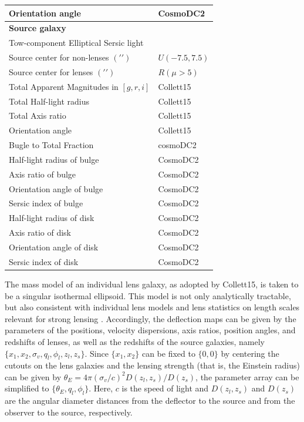 \documentclass[12pt, twocolumn, apj]{openjournal}
\begin{document}
\begin{table}
\begin{center}
\begin{tabular}{ l l}
Orientation angle & CosmoDC2 \\
\hline \hline
{\bf Source galaxy}\\
\hline \hline
{Tow-component Elliptical Sersic light} \\ 
\hline
Source center for non-lenses $(\prime\prime)$ & $U(-7.5, 7.5)$ \\
Source center for lenses $(\prime\prime)$ & $R(\mu > 5)$ \\
Total Apparent Magnitudes in $[g,r,i]$ & Collett15 \\
Total Half-light radius & Collett15 \\ 
Total Axis ratio & Collett15 \\
Orientation angle & Collett15 \\
Bugle to Total Fraction & cosmoDC2\\
\hline
Half-light radius of bulge & CosmoDC2 \\ 
Axis ratio of bulge & CosmoDC2 \\
Orientation angle of bulge & CosmoDC2 \\
Sersic index of bulge & CosmoDC2\\
\hline
Half-light radius of disk & CosmoDC2 \\ 
Axis ratio of disk & CosmoDC2 \\
Orientation angle of disk & CosmoDC2 \\
Sersic index of disk & CosmoDC2 \\
\hline
\hline
\end{tabular}
\end{center}
\end{table}



The mass model of an individual lens galaxy, as adopted by Collett15, is taken to be a singular isothermal ellipsoid.  This model is not only analytically tractable, but also consistent with individual lens models and lens statistics on length scales relevant for strong lensing \citep{Koopmans2006, Gavazzi2007, Dye2008}. Accordingly, the deflection maps can be given by the parameters of the positions, velocity dispersions, axis ratios, position angles, and redshifts of lenses, as well as the redshifts of the source galaxies, namely $\{x_1, x_2, \sigma_v, q_l, \phi_l, z_l, z_s\}$. Since $\{x_1, x_2\}$ can be fixed to $\{0, 0\}$ by centering the cutouts on the lens galaxies and the lensing strength (that is, the Einstein radius) can be given by $\theta_E = 4 \pi (\sigma_v/c)^2 D(z_l, z_s)/D(z_s)$, the parameter array can be simplified to $\{\theta_E, q_l, \phi_l\}$. Here, $c$ is the speed of light and $D(z_l, z_s)$ and $D(z_s)$ are the angular diameter distances from the deflector to the source and from the observer to the source, respectively.
\end{document}

